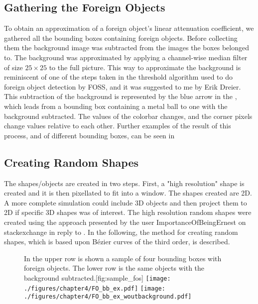 \subsection{Gathering the Foreign Objects}
To obtain an approximation of a foreign object's linear attenuation coefficient, we gathered all the bounding boxes containing foreign objects. Before collecting them the background image was subtracted from the images the boxes belonged to. 
The background was approximated by applying a channel-wise median filter of size $25 \times 25$ to the full picture.
This way to approximate the background is reminiscent of one of the steps taken in the threshold algorithm used to do foreign object detection by FOSS, and it was suggested to me by Erik Dreier. 
This subtraction of the background is represented by the blue arrow in the , which leads from a bounding box containing a metal ball to one with the background subtracted. 
The values of the colorbar changes, and the corner pixels change values relative to each other.
Further examples of the result of this process, and of different bounding boxes, can be seen in 

\subsection{Creating Random Shapes}
The shapes/objects are created in two steps. First, a "high resolution" shape is created and it is then pixellated to fit into a window.
The shapes created are 2D. 
A more complete simulation could include 3D objects and then project them to 2D if specific 3D shapes was of interest.
The high resolution random shapes were created using the approach presented by the user ImportanceOfBeingErnest on stackexchange in reply to \cite{PythonCreateRandom}. In the following, the method for creating random shapes, which is based upon Bézier curves of the third order, is described.

\begin{figure}[t]
	\begin{sidecaption}{In the upper row is shown a sample of four bounding boxes with foreign objects. The lower row is the same objects with the background subtracted.}[fig:sample_fos]
		\centering
		\texttt{[image: ./figures/chapter4/FO\_bb\_ex.pdf]}
		\texttt{[image: ./figures/chapter4/FO\_bb\_ex\_woutbackground.pdf]}
	\end{sidecaption}
\end{figure}

